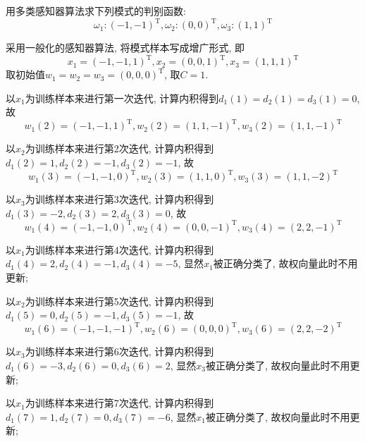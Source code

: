 \documentclass{article}
\begin{document}
\begin{homeworkProblem}
	用多类感知器算法求下列模式的判别函数:
	$$\omega _1:\left( -1,-1 \right) ^{\mathrm{T}},  \omega _2:\left( 0,0 \right) ^{\mathrm{T}},  \omega _3:\left( 1,1 \right) ^{\mathrm{T}}
	$$

	\solution 采用一般化的感知器算法, 将模式样本写成增广形式, 即
	$$x_1=\left( -1,-1,1 \right) ^{\mathrm{T}}, x_2=\left( 0,0,1 \right) ^{\mathrm{T}}, x_3=\left( 1,1,1 \right) ^{\mathrm{T}}
	$$
	取初始值$w_1=w_2=w_3=(0,0,0)^{\mathrm{T}}$, 取$C=1$. 
	
	以$x_1$为训练样本来进行第一次迭代, 计算内积得到$d_1(1)=d_2(1)=d_3(1)=0$, 故
	$$w_1\left( 2 \right) =\left( -1,-1,1 \right) ^{\mathrm{T}}, w_2\left( 2 \right) =\left( 1,1,-1 \right) ^{\mathrm{T}}, w_3\left( 2 \right) =\left( 1,1,-1 \right) ^{\mathrm{T}}
	$$

	以$x_2$为训练样本来进行第2次迭代, 计算内积得到$d_1(2)=1,d_2(2)=-1,d_3(2)=-1$, 故$$w_1\left( 3 \right) =\left( -1,-1,0 \right) ^{\mathrm{T}}, w_2\left( 3 \right) =\left( 1,1,0 \right) ^{\mathrm{T}}, w_3\left( 3 \right) =\left( 1,1,-2 \right) ^{\mathrm{T}}
	$$

	以$x_3$为训练样本来进行第3次迭代, 计算内积得到$d_1(3)=-2, d_2(3)=2, d_3(3)=0$, 故$$w_1\left( 4 \right) =\left( -1,-1,0 \right) ^{\mathrm{T}}, w_2\left( 4 \right) =\left( 0,0,-1 \right) ^{\mathrm{T}}, w_3\left( 4 \right) =\left( 2,2,-1 \right) ^{\mathrm{T}}
	$$

	以$x_1$为训练样本来进行第4次迭代, 计算内积得到$d_1(4)=2,d_2(4)=-1,d_3(4)=-5$, 显然$x_1$被正确分类了, 故权向量此时不用更新;

	以$x_2$为训练样本来进行第5次迭代, 计算内积得到$d_1(5)=0, d_2(5)=-1, d_3(5)=-1$, 故
	$$w_1\left( 6 \right) =\left( -1,-1,-1 \right) ^{\mathrm{T}}, w_2\left( 6 \right) =\left( 0,0,0 \right) ^{\mathrm{T}}, w_3\left( 6 \right) =\left( 2,2,-2 \right) ^{\mathrm{T}}
	$$

	以$x_3$为训练样本来进行第6次迭代, 计算内积得到$d_1(6)=-3, d_2(6)=0, d_3(6)=2$, 显然$x_3$被正确分类了, 故权向量此时不用更新;

	以$x_1$为训练样本来进行第7次迭代, 计算内积得到$d_1(7)=1, d_2(7)=0, d_3(7)=-6$, 显然$x_1$被正确分类了, 故权向量此时不用更新;


\end{homeworkProblem}
\end{document}
